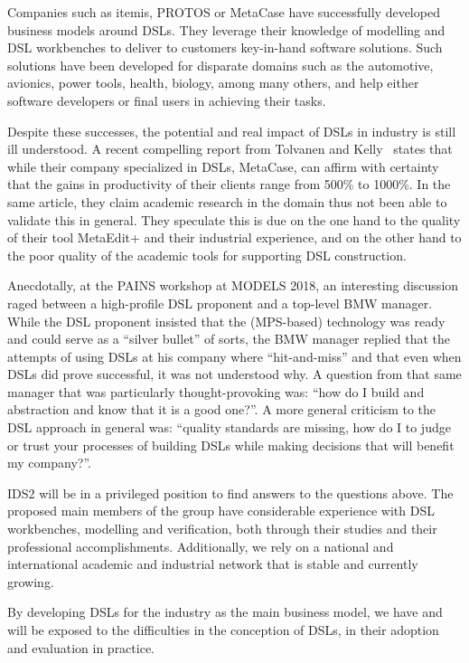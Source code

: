 \documentclass{article}
\begin{document}
Companies such as itemis, PROTOS or MetaCase have successfully developed
business models around DSLs. They leverage their knowledge of modelling and DSL workbenches to
deliver to customers key-in-hand software solutions. Such solutions have been
developed for disparate domains such as the automotive, avionics, power tools,
health, biology, among many others, and help either software developers or final
users in achieving their tasks.

Despite these successes, the potential and real impact of DSLs in industry is
still ill understood. A recent compelling report from Tolvanen and
Kelly~\cite{Tolvanen016} states that while their company specialized in
DSLs, MetaCase, can affirm with certainty that the gains in productivity of
their clients range from 500\% to 1000\%. In the same article, they claim
academic research in the domain thus not been able to validate this in general.
They speculate this is due on the one hand to the quality of their tool
MetaEdit+ and their industrial experience, and on the other hand to the poor
quality of the academic tools for supporting DSL construction.

Anecdotally, at the PAINS workshop at MODELS 2018, an interesting discussion
raged between a high-profile DSL proponent and a top-level BMW manager. While
the DSL proponent insisted that the (MPS-based) technology was ready and could
serve as a ``silver bullet'' of sorts, the BMW manager replied that the attempts of using
DSLs at his company where ``hit-and-miss'' and that even when DSLs did prove
successful, it was not understood why. A question from that same manager that
was particularly thought-provoking was: ``how do I build and abstraction and
know that it is a good one?''. A more general criticism to the DSL approach in
general was: ``quality standards are missing, how do I to judge or trust your
processes of building DSLs while making decisions that will benefit my company?''.

IDS2 will be in a privileged position to find answers to the questions
above. The proposed main members of the group have considerable experience with
DSL workbenches, modelling and verification, both through their studies and their
professional accomplishments. Additionally, we rely on a national and
international academic and industrial network that is stable and currently
growing.

By developing DSLs for the industry as the main business model, we have and will
be exposed to the difficulties in the conception of DSLs, in their adoption and
evaluation in practice.\\
\end{document}
